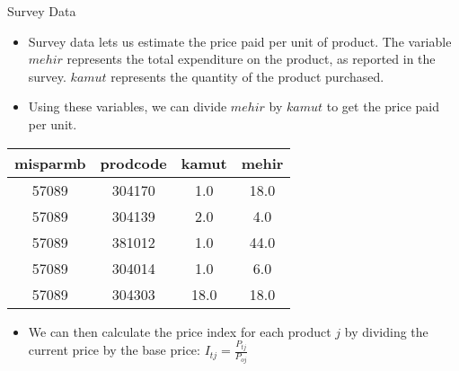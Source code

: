 \documentclass{beamer}
\begin{document}
\begin{frame}{Survey Data}
    \begin{itemize}
        \item Survey data lets us estimate the price paid per unit of product. The variable $mehir$ represents the total expenditure on the product, as reported in the survey. $kamut$ represents the quantity of the product purchased.
        \item Using these variables, we can divide $mehir$ by $kamut$ to get the price paid per unit.
    \end{itemize}
    \begin{table}[h]
        \centering
        \begin{tabular}{c c c c}
            \hline
            \textbf{misparmb} & \textbf{prodcode} & \textbf{kamut} & \textbf{mehir} \\
            \hline
            57089             & 304170            & 1.0            & 18.0           \\
            57089             & 304139            & 2.0            & 4.0            \\
            57089             & 381012            & 1.0            & 44.0           \\
            57089             & 304014            & 1.0            & 6.0            \\
            57089             & 304303            & 18.0           & 18.0           \\
            \hline
        \end{tabular}
        \label{tab:survey_table}
    \end{table}
    \begin{itemize}
        \item We can then calculate the price index for each product $j$ by dividing the current price by the base price: $I_{tj}=\frac{P_{tj}}{P_{oj}}$
    \end{itemize}
\end{frame}
\end{document}

